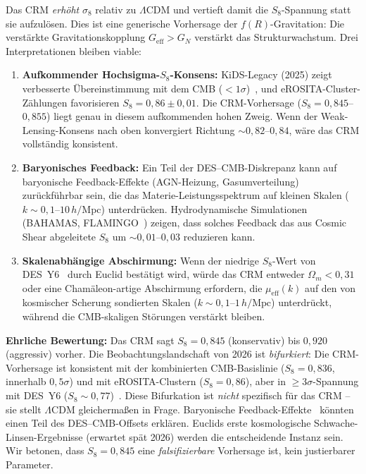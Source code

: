 \documentclass[11pt,a4paper]{article}
\begin{document}
Das CRM \textit{erh\"oht} $\sigma_8$ relativ zu $\Lambda$CDM und vertieft damit die $S_8$-Spannung statt sie aufzul\"osen. Dies ist eine generische Vorhersage der $f(R)$-Gravitation: Die verst\"arkte Gravitationskopplung $G_{\mathrm{eff}} > G_N$ verst\"arkt das Strukturwachstum. Drei Interpretationen bleiben viable:

\begin{enumerate}
\item \textbf{Aufkommender Hochsigma-$S_8$-Konsens:} KiDS-Legacy (2025) zeigt verbesserte \"Ubereinstimmung mit dem CMB ($< 1\sigma$)~\cite{S8Review2026}, und eROSITA-Cluster-Z\"ahlungen favorisieren $S_8 = 0{,}86 \pm 0{,}01$. Die CRM-Vorhersage ($S_8 = 0{,}845$--$0{,}855$) liegt genau in diesem aufkommenden hohen Zweig. Wenn der Weak-Lensing-Konsens nach oben konvergiert Richtung $\sim 0{,}82$--$0{,}84$, w\"are das CRM vollst\"andig konsistent.

\item \textbf{Baryonisches Feedback:} Ein Teil der DES--CMB-Diskrepanz kann auf baryonische Feedback-Effekte (AGN-Heizung, Gasumverteilung) zur\"uckf\"uhrbar sein, die das Materie-Leistungsspektrum auf kleinen Skalen ($k \sim 0{,}1$--$10\,h/$Mpc) unterdr\"ucken. Hydrodynamische Simulationen (BAHAMAS, FLAMINGO~\cite{FLAMINGO2024}) zeigen, dass solches Feedback das aus Cosmic Shear abgeleitete $S_8$ um $\sim 0{,}01$--$0{,}03$ reduzieren kann.

\item \textbf{Skalenabh\"angige Abschirmung:} Wenn der niedrige $S_8$-Wert von DES~Y6~\cite{DESY6} durch Euclid best\"atigt wird, w\"urde das CRM entweder $\Omega_m < 0{,}31$ oder eine Cham\"aleon-artige Abschirmung erfordern, die $\mu_{\mathrm{eff}}(k)$ auf den von kosmischer Scherung sondierten Skalen ($k \sim 0{,}1$--$1 \, h/\mathrm{Mpc}$) unterdr\"uckt, w\"ahrend die CMB-skaligen St\"orungen verst\"arkt bleiben.
\end{enumerate}

\textbf{Ehrliche Bewertung:} Das CRM sagt $S_8 = 0{,}845$ (konservativ) bis $0{,}920$ (aggressiv) vorher. Die Beobachtungslandschaft von 2026 ist \emph{bifurkiert}: Die CRM-Vorhersage ist konsistent mit der kombinierten CMB-Basislinie ($S_8 = 0{,}836$, innerhalb $0{,}5\sigma$) und mit eROSITA-Clustern ($S_8 = 0{,}86$), aber in $\geq 3\sigma$-Spannung mit DES~Y6 ($S_8 \sim 0{,}77$)~\cite{DESY6}. Diese Bifurkation ist \emph{nicht} spezifisch f\"ur das CRM -- sie stellt $\Lambda$CDM gleicherma\ss en in Frage. Baryonische Feedback-Effekte~\cite{FLAMINGO2024} k\"onnten einen Teil des DES--CMB-Offsets erkl\"aren. Euclids erste kosmologische Schwache-Linsen-Ergebnisse (erwartet sp\"at 2026) werden die entscheidende Instanz sein. Wir betonen, dass $S_8 = 0{,}845$ eine \textit{falsifizierbare} Vorhersage ist, kein justierbarer Parameter.
\end{document}

